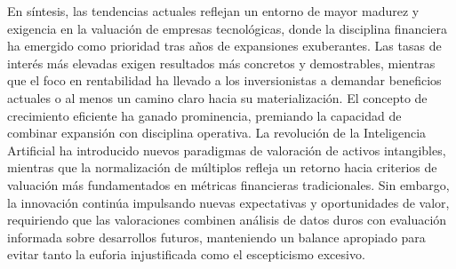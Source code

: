 En síntesis, las tendencias actuales reflejan un entorno de mayor madurez y exigencia en la valuación de empresas tecnológicas, donde la disciplina financiera ha emergido como prioridad tras años de expansiones exuberantes. Las tasas de interés más elevadas exigen resultados más concretos y demostrables, mientras que el foco en rentabilidad ha llevado a los inversionistas a demandar beneficios actuales o al menos un camino claro hacia su materialización. El concepto de crecimiento eficiente ha ganado prominencia, premiando la capacidad de combinar expansión con disciplina operativa. La revolución de la Inteligencia Artificial ha introducido nuevos paradigmas de valoración de activos intangibles, mientras que la normalización de múltiplos refleja un retorno hacia criterios de valuación más fundamentados en métricas financieras tradicionales. Sin embargo, la innovación continúa impulsando nuevas expectativas y oportunidades de valor, requiriendo que las valoraciones combinen análisis de datos duros con evaluación informada sobre desarrollos futuros, manteniendo un balance apropiado para evitar tanto la euforia injustificada como el escepticismo excesivo. 